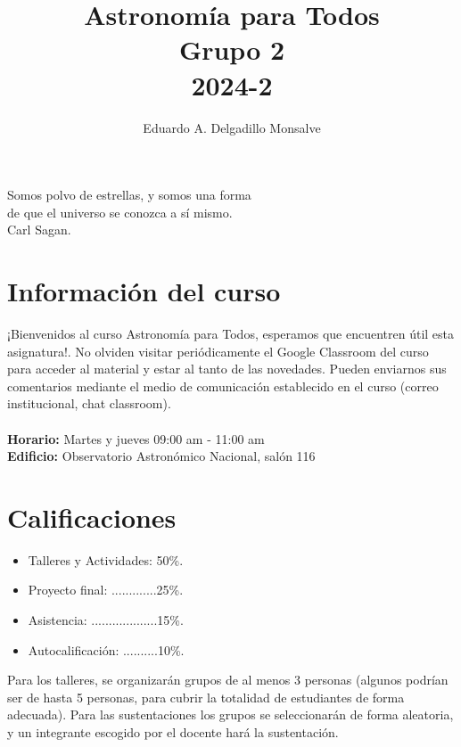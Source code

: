 \documentclass[12pt]{article}
\title{\textbf{Astronomía para Todos}\\ \small Grupo 2\\ 2024-2}
\author[1]{\raggedright Eduardo A. Delgadillo Monsalve}
\affil[1]{\raggedright\small MSc estudiante - Astronomía (eadelgadillom@unal.edu.co) \newline \small Observatorio Astronómico Nacional, Universidad Nacional de Colombia}
\date{}
\begin{document}
\maketitle
\begin{flushright}
    Somos polvo de estrellas, y somos una forma\\ de que el universo se conozca a sí mismo.\\ Carl Sagan.
\end{flushright}

\section*{Información del curso}
¡Bienvenidos al curso Astronomía para Todos, esperamos que encuentren útil esta asignatura!. No olviden visitar periódicamente el Google Classroom del curso para acceder al material y estar al tanto de las novedades. Pueden enviarnos sus comentarios mediante el medio de comunicación establecido en el curso (correo institucional, chat classroom).\\
\\
\textbf{Horario:} Martes y jueves 09:00 am - 11:00 am\\
\textbf{Edificio:} Observatorio Astronómico Nacional, salón 116

\section*{Calificaciones}
\begin{itemize}
    \item Talleres y Actividades: 50\%.
    \item Proyecto final: .............25\%.
    \item Asistencia: ...................15\%.
    \item Autocalificación: ..........10\%.
\end{itemize}

Para los talleres, se organizarán grupos de al menos 3 personas (algunos podrían ser de hasta 5 personas, para cubrir la totalidad de estudiantes de forma adecuada). Para las sustentaciones los grupos se seleccionarán de forma aleatoria, y un integrante escogido por el docente hará la sustentación.
\end{document}
